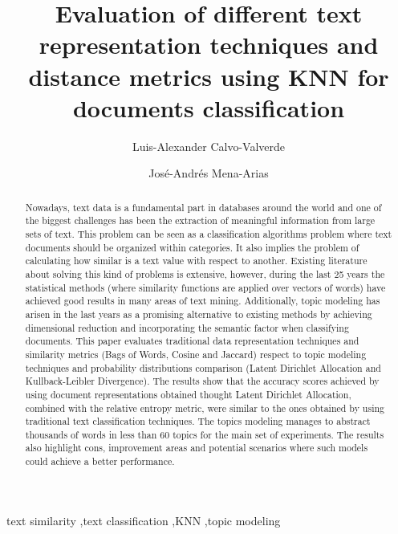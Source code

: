 \documentclass[preprint,12pt,3p]{elsarticle}
\begin{document}
\begin{frontmatter}

\title{Evaluation of different text representation techniques and distance metrics using KNN for documents classification}

\author[label1]{Luis-Alexander Calvo-Valverde}
\address[label1]{DOCINADE, Instituto Tecnol\'{o}gico de Costa Rica, Cartago, Costa Rica}

\author[label2]{Jos\'{e}-Andr\'{e}s Mena-Arias}
\address[label2]{Maestr\'{i}a en Computaci\'{o}n, Instituto Tecnol\'{o}gico de Costa Rica}


\begin{abstract}
Nowadays, text data is a fundamental part in databases around the world and one of the biggest challenges has been the extraction of meaningful information from large sets of text. This problem can be seen as a classification algorithms problem where text documents should be organized within categories. It also implies the problem of calculating how similar is a text value with respect to another. Existing literature about solving this kind of problems is extensive, however, during the last 25 years the statistical methods (where similarity functions are applied over vectors of words) have achieved good results in many areas of text mining. Additionally, topic modeling has arisen in the last years as a promising alternative to existing methods by achieving dimensional reduction and incorporating the semantic factor when classifying documents. This paper evaluates traditional data representation techniques and similarity metrics (Bags of Words, Cosine and Jaccard) respect to topic modeling techniques and probability distributions comparison (Latent Dirichlet Allocation and Kullback-Leibler Divergence). The results show that the accuracy scores achieved by using document representations obtained thought Latent Dirichlet Allocation, combined with the relative entropy metric, were similar to the ones obtained by using traditional text classification techniques. The topics modeling manages to abstract thousands of words in less than 60 topics for the main set of experiments. The results also highlight cons, improvement areas and potential scenarios where such models could achieve a better performance. 
\end{abstract}

\begin{keyword}
text similarity \sep text classification \sep KNN \sep topic modeling 
\end{keyword}

\end{frontmatter}
\end{document}
